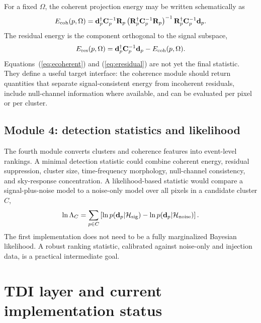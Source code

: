 \documentclass[%
 reprint,
 amsmath,amssymb,
 aps,
 prd,
]{revtex4-2}
\begin{document}
For a fixed $\Omega$, the coherent projection energy may be written schematically as
\begin{equation}
E_{\rm coh}(p,\Omega) =
\mathbf d_p^\dagger \mathbf C_p^{-1}\mathbf R_p
\left(\mathbf R_p^\dagger \mathbf C_p^{-1}\mathbf R_p\right)^{-1}
\mathbf R_p^\dagger \mathbf C_p^{-1}\mathbf d_p .
\label{eq:ecoherent}
\end{equation}
The residual energy is the component orthogonal to the signal subspace,
\begin{equation}
E_{\rm res}(p,\Omega) =
\mathbf d_p^\dagger \mathbf C_p^{-1}\mathbf d_p - E_{\rm coh}(p,\Omega).
\label{eq:eresidual}
\end{equation}
Equations~(\ref{eq:ecoherent}) and (\ref{eq:eresidual}) are not yet the final statistic.  They define a useful target interface: the coherence module should return quantities that separate signal-consistent energy from incoherent residuals, include null-channel information where available, and can be evaluated per pixel or per cluster.

\subsection{Module 4: detection statistics and likelihood}
\label{subsec:detection_module}

The fourth module converts clusters and coherence features into event-level rankings.  A minimal detection statistic could combine coherent energy, residual suppression, cluster size, time-frequency morphology, null-channel consistency, and sky-response concentration.  A likelihood-based statistic would compare a signal-plus-noise model to a noise-only model over all pixels in a candidate cluster $C$,
\begin{equation}
\ln \Lambda_C =
\sum_{p\in C}\left[\ln p(\mathbf d_p|\mathcal H_{\rm sig})
-\ln p(\mathbf d_p|\mathcal H_{\rm noise})\right].
\label{eq:likelihood_ratio}
\end{equation}
The first implementation does not need to be a fully marginalized Bayesian likelihood.  A robust ranking statistic, calibrated against noise-only and injection data, is a practical intermediate goal.

\section{TDI layer and current implementation status}
\label{sec:tdi}
\end{document}
